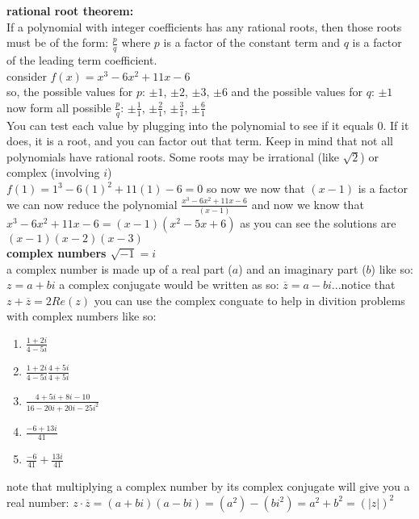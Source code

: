 \documentclass{article}
\begin{document}
\textbf{rational root theorem:}\\

If a polynomial with integer coefficients has any rational roots, then those roots must be of the form: $\frac{p}{q}$ where $p$ is a factor of the constant term and $q$ is a factor of the leading term coefficient.\\

consider $f(x) = x^3 - 6x^2 + 11x - 6$\\
so, the possible values for $p$: $\pm1$, $\pm2$, $\pm3$, $\pm6$ and the possible values for $q$: $\pm1$\\
now form all possible $\frac{p}{q}$: $\pm\frac{1}{1}$, $\pm\frac{2}{1}$, $\pm\frac{3}{1}$, $\pm\frac{6}{1}$\\
You can test each value by plugging into the polynomial to see if it equals 0. If it does, it is a root, and you can factor out that term. Keep in mind that not all polynomials have rational roots. Some roots may be irrational (like $\sqrt{2}$) or complex (involving $i$)\\

$f(1) = 1^3 - 6(1)^2 + 11(1) - 6 = 0$ so now we now that $(x - 1)$ is a factor\\
we can now reduce the polynomial $\frac{x^3 - 6x^2 + 11x - 6}{(x - 1)}$ and now we know that $x^3 - 6x^2 + 11x - 6 = (x - 1)(x^2 - 5x + 6)$ as you can see the solutions are $(x - 1)(x - 2)(x - 3)$\\


\textbf{complex numbers $\sqrt{-1} = i$}\\

a complex number is made up of a real part ($a$) and an imaginary part ($b$) like so: $z = a + bi$ a complex conjugate would be written as so: $\overline{z} = a - bi$...notice that $z + \overline{z} = 2Re(z)$ you can use the complex conguate to help in divition problems with complex numbers like so:
	\begin{enumerate}
		\item $\frac{1 + 2i}{4 - 5i}$
		\item $\frac{1 + 2i}{4 - 5i}\frac{4 + 5i}{4 + 5i}$
		\item $\frac{4 + 5i + 8i - 10}{16 - 20i + 20i - 25i^2}$
		\item $\frac{-6 + 13i}{41}$
		\item $\frac{-6}{41} + \frac{13i}{41}$	
	\end{enumerate}

note that multiplying a complex number by its complex conjugate will give you a real number: $z \cdot \overline{z} = (a + bi)(a - bi) = (a^2) - (bi^2) = a^2 + b^2 = (\lvert z \rvert)^2$\\
\end{document}
